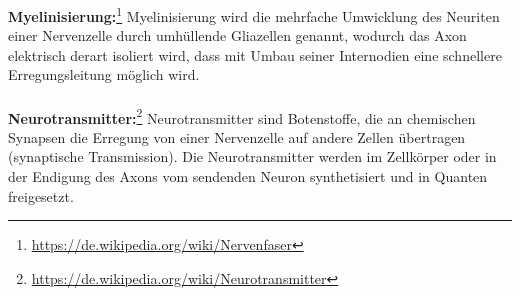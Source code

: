 \textbf{Myelinisierung:}\footnote{\url{https://de.wikipedia.org/wiki/Nervenfaser}} Myelinisierung wird die mehrfache Umwicklung des Neuriten einer Nervenzelle durch umhüllende Gliazellen genannt, wodurch das Axon elektrisch derart isoliert wird, dass mit Umbau seiner Internodien eine schnellere Erregungsleitung möglich wird.
\\\\
\textbf{Neurotransmitter:}\footnote{\url{https://de.wikipedia.org/wiki/Neurotransmitter}} Neurotransmitter sind Botenstoffe, die an chemischen Synapsen die Erregung von einer Nervenzelle auf andere Zellen übertragen (synaptische Transmission). Die Neurotransmitter werden im Zellkörper oder in der Endigung des Axons vom sendenden Neuron synthetisiert und in Quanten freigesetzt.
